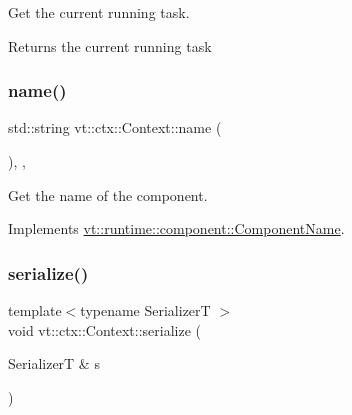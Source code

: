 Get the current running task. 

\begin{DoxyReturn}{Returns}
the current running task 
\end{DoxyReturn}
\mbox{\label{structvt_1_1ctx_1_1_context_a6bef35c171d45feb409d7b6aa6168996}} 
\subsubsection{\texorpdfstring{name()}{name()}}
{\footnotesize\ttfamily std\+::string vt\+::ctx\+::\+Context\+::name (\begin{DoxyParamCaption}{ }\end{DoxyParamCaption})\hspace{0.3cm}{\ttfamily [inline]}, {\ttfamily [override]}, {\ttfamily [virtual]}}



Get the name of the component. 



Implements \hyperlink{structvt_1_1runtime_1_1component_1_1_component_name_a33c06229bb605a2b2ceff68830d6d773}{vt\+::runtime\+::component\+::\+Component\+Name}.

\mbox{\label{structvt_1_1ctx_1_1_context_a510b7a30a4e10b95528a8a9c2306a075}} 
\subsubsection{\texorpdfstring{serialize()}{serialize()}}
{\footnotesize\ttfamily template$<$typename SerializerT $>$ \\
void vt\+::ctx\+::\+Context\+::serialize (\begin{DoxyParamCaption}\item[{SerializerT \&}]{s }\end{DoxyParamCaption})\hspace{0.3cm}{\ttfamily [inline]}}

\mbox{\label{structvt_1_1ctx_1_1_context_a81b5dbccaaca10fcce4ed7c89ceca38c}} 
